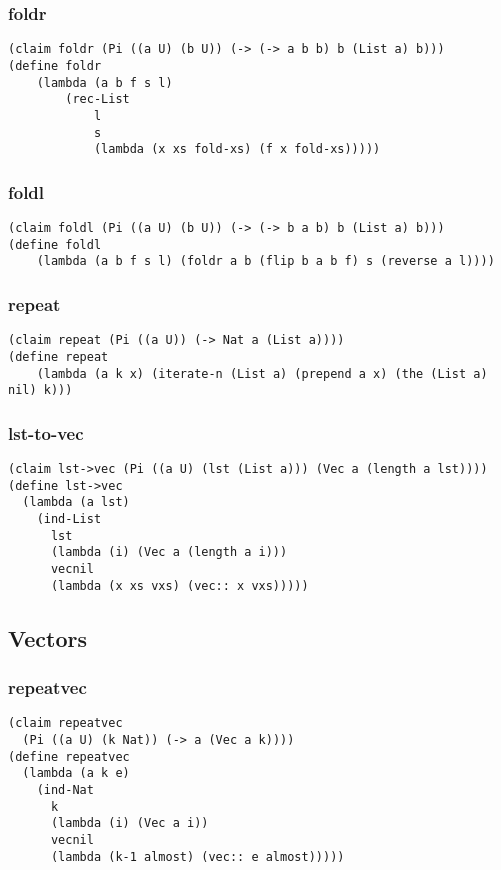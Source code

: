 \subsubsection{foldr} \label{code:foldr}
\begin{verbatim}
(claim foldr (Pi ((a U) (b U)) (-> (-> a b b) b (List a) b)))
(define foldr
    (lambda (a b f s l)
        (rec-List 
            l
            s
            (lambda (x xs fold-xs) (f x fold-xs)))))
\end{verbatim}

\subsubsection{foldl} \label{code:foldl}
\begin{verbatim}
(claim foldl (Pi ((a U) (b U)) (-> (-> b a b) b (List a) b)))
(define foldl
    (lambda (a b f s l) (foldr a b (flip b a b f) s (reverse a l))))
\end{verbatim}

\subsubsection{repeat} \label{code:repeat}
\begin{verbatim}
(claim repeat (Pi ((a U)) (-> Nat a (List a))))
(define repeat
    (lambda (a k x) (iterate-n (List a) (prepend a x) (the (List a) nil) k)))
\end{verbatim}


\subsubsection{lst-to-vec} \label{code:lst-to-vec}
\begin{verbatim}
(claim lst->vec (Pi ((a U) (lst (List a))) (Vec a (length a lst))))
(define lst->vec
  (lambda (a lst)
    (ind-List
      lst
      (lambda (i) (Vec a (length a i)))
      vecnil
      (lambda (x xs vxs) (vec:: x vxs)))))
\end{verbatim}

\subsection{Vectors}

\subsubsection{repeatvec} \label{code:repeatvec}
\begin{verbatim}
(claim repeatvec
  (Pi ((a U) (k Nat)) (-> a (Vec a k))))
(define repeatvec
  (lambda (a k e)
    (ind-Nat
      k
      (lambda (i) (Vec a i))
      vecnil
      (lambda (k-1 almost) (vec:: e almost)))))
\end{verbatim}

